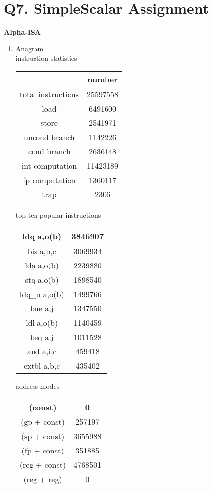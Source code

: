 \documentclass[12pt]{article}
\begin{document}
\section{Q7. SimpleScalar Assignment}
\textbf{Alpha-ISA}
	\begin{enumerate}
		\item 
		Anagram\\
		instruction statistics\\
		\begin{tabular}{|c|c|}
		\hline
			 & number\\
		\hline
		total instructions & 25597558\\
		\hline
		load             &   6491600  \\
		\hline
		store             &  2541971  \\
		\hline
		uncond branch      & 1142226  \\
		\hline
		cond branch         &2636148 \\
		\hline
		int computation    &11423189 \\
		\hline
		fp computation     & 1360117 \\
		\hline
		trap                &   2306   \\
		\hline
		\end{tabular}
		
		top ten popular instructions\\
		\begin{tabular}{|c|c|}
		\hline
		ldq      a,o(b)  &  3846907 \\ 
 		\hline
		bis      a,b,c  &  3069934 \\ 
 		\hline
		lda      a,o(b)  &  2239880 \\ 
 		\hline
		stq      a,o(b)  &  1898540 \\ 
 		\hline
		ldq\_u    a,o(b)  &  1499766 \\ 
 		\hline
		bne      a,j  &  1347550 \\ 
 		\hline
		ldl      a,o(b)  &  1140459 \\ 
 		\hline
		beq      a,j  &  1011528 \\ 
 		\hline
		and      a,i,c  &  459418 \\ 
 		\hline
		extbl    a,b,c  &  435402 \\ 
 		\hline
		\end{tabular}

		address modes\\
		\begin{tabular}{|c|c|}
		\hline
		(const)          &         0  \\ \hline
		(gp + const)      &   257197   \\ \hline
		(sp + const)      &  3655988  \\ \hline
		(fp + const)      &   351885   \\ \hline
		(reg + const)     &  4768501   \\ \hline
		(reg + reg)       &        0   \\
 		\hline
		\end{tabular}
		

\end{enumerate}
\end{document}

